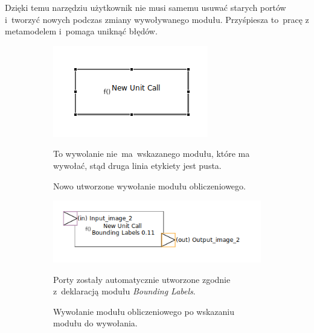 Dzięki temu narzędziu użytkownik nie musi samemu usuwać starych portów
i~tworzyć nowych podczas zmiany wywoływanego modułu. Przyśpiesza to~pracę z
metamodelem i~pomaga uniknąć błędów.

\begin{figure}
	\centering
	\begin{subfigure}{.3\textwidth}
		\centering
		\includegraphics[width=.99\linewidth]{./images/sirius-desktop-empty-unit-call.png}
		\caption{Nowo utworzone wywołanie modułu obliczeniowego.}\label{ref:sirius-desktop-empty-unit-call}
    \medskip
    {\small To wywolanie nie~ma~wskazanego modułu, które ma wywołać, stąd
      druga linia etykiety jest pusta.}
    \vspace{50pt}
	\end{subfigure}
	\begin{subfigure}{.3\textwidth}
		\centering
		\includegraphics[width=.99\linewidth]{./images/sirius-desktop-change-unit-to-call-before.png}
		\caption{Wywołanie modułu obliczeniowego po wskazaniu modułu do wywołania.}\label{
      rys:sirius-desktop-change-unit-to-call-before}
    \medskip
    {\small Porty zostały automatycznie utworzone zgodnie z~deklaracją modułu
      \emph{Bounding Labels}.}
    \medskip
	\end{subfigure}
	\begin{subfigure}{.3\textwidth}

\end{subfigure}
\end{figure}
